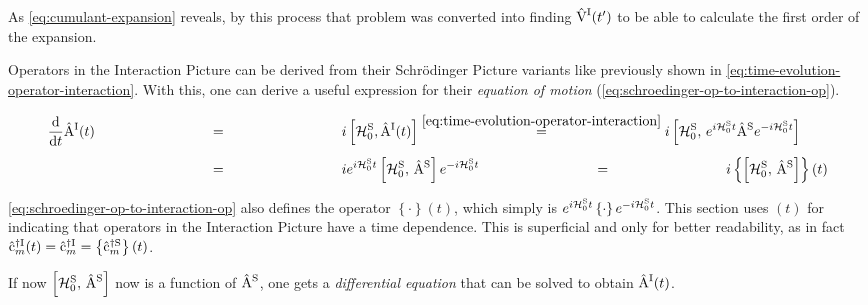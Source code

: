 As \autoref{eq:cumulant-expansion} reveals, by this process that problem was converted into finding $\VhamiltonianOf[\interactionPicture]{t'}$ to be able to calculate the first order of the expansion.

Operators in the Interaction Picture can be derived from their Schrödinger Picture variants like previously shown in \autoref{eq:time-evolution-operator-interaction}. 
With this, one can derive a useful expression for their \emph{equation of motion} (\autoref{eq:schroedinger-op-to-interaction-op}).

\begin{equation}
    \label{eq:schroedinger-op-to-interaction-op}
    \begin{split}
        \difft{}\AopOfT[\interactionPicture] &\stackrel{\phantom{\ref{eq:time-evolution-operator-interaction}}}{=} i \left[\HzeroHamiltonian[\schroedingerPicture], \AopOfT[\interactionPicture]\right]
        \stackrel{\ref{eq:time-evolution-operator-interaction}}{=}
        i \left[\HzeroHamiltonian[\schroedingerPicture],\,e^{i \HzeroHamiltonian[\schroedingerPicture]{} t} \Aop[\schroedingerPicture] e^{-i \HzeroHamiltonian[\schroedingerPicture]{} t}\right]\\
        &\stackrel{\phantom{\ref{eq:time-evolution-operator-interaction}}}{=}
        i e^{i \HzeroHamiltonian[\schroedingerPicture]{} t}\left[\HzeroHamiltonian[\schroedingerPicture],\, \Aop[\schroedingerPicture]\right]e^{-i \HzeroHamiltonian[\schroedingerPicture]{} t}
        \stackrel{\phantom{\ref{eq:time-evolution-operator-interaction}}}{=}
        i \left\{\left[\HzeroHamiltonian[\schroedingerPicture],\, \Aop[\schroedingerPicture]\right]\right\}(t)
    \end{split}
\end{equation}

\autoref{eq:schroedinger-op-to-interaction-op} also defines the operator $\left\{\cdot \right\}(t)$, which simply is $e^{i \HzeroHamiltonian[\schroedingerPicture]{} t} \left\{\cdot \right\} e^{-i \HzeroHamiltonian[\schroedingerPicture]{} t}$.
This section uses $(t)$ for indicating that operators in the Interaction Picture have a time dependence. 
This is superficial and only for better readability, as in fact $\copOfT[\interactionPicture]{m}{\dagger} = \cop[\interactionPicture]{m}{\dagger} = \left\{\cop[\schroedingerPicture]{m}{\dagger} \right\}(t)$.

If now $\left[\HzeroHamiltonian[\schroedingerPicture],\, \Aop[\schroedingerPicture]\right]$ now is a function of $\Aop[\schroedingerPicture]$, one gets a \emph{differential equation} that can be solved to obtain $\AopOfT[\interactionPicture]$.

